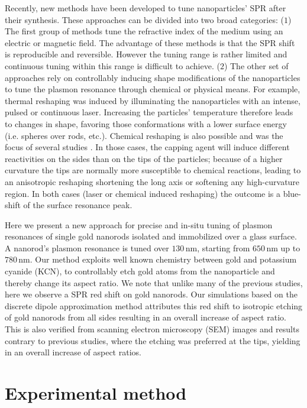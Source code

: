 \documentclass[a4paper,oneside,onecolumn]{article}
\newcommand{\nm}{\ensuremath{\,\textrm{nm}}}
\begin{document}
Recently, new methods have been developed to tune nanoparticles' SPR after their
synthesis. These approaches can be divided into two broad categories: ($1$) The
first group of methods tune the refractive index of the medium using an electric
or magnetic field\cite{Kossyrev2005}. The advantage of these methods is that the
SPR shift is reproducible and reversible. However the tuning range is rather
limited and continuous tuning within this range is difficult to achieve.
($2$) The other set of approaches rely on controllably inducing shape
modifications of the nanoparticles to tune the plasmon resonance through
chemical or physical means. For example, thermal reshaping was induced by
illuminating the nanoparticles with an intense, pulsed
\cite{Link2000}\cite{Horiguchi2008} or continuous laser\cite{Yorulmaz2012}.
Increasing the particles' temperature therefore leads to changes in shape,
favoring those conformations with a lower surface energy (i.e.
spheres over rods, etc.). Chemical reshaping is also possible and was the focus
of several studies\cite{Carbo-Argibay2007}
\cite{Rodriguez-Fernandez2005} \cite{Jana2002}. In those cases, the capping
agent will induce different reactivities on the sides than on the tips of the
particles; because of a higher curvature\cite{Yuan2015} the tips are
normally more susceptible to chemical reactions, leading to an anisotropic reshaping
shortening the long axis or softening any high-curvature region. In both cases
(laser or chemical induced reshaping) the outcome is a blue-shift of the surface
resonance peak.

Here we present a new approach for precise and in-situ tuning of plasmon
resonances of single gold nanorods isolated and immobilized over a glass
surface. A nanorod's plasmon resonance is tuned over $130\nm$, starting from
$650\nm$ up to $780\nm$. Our method exploits well known chemistry between gold
and potassium cyanide (KCN), to controllably etch gold atoms from the
nanoparticle and thereby change its aspect ratio. We note that unlike many of
the previous studies, here we observe a SPR red shift on gold nanorods.
Our simulations based on the discrete dipole approximation method attributes
this red shift to isotropic etching of gold nanorods from all sides resulting in
an overall increase of aspect ratio.  This is also verified from scanning
electron microscopy (SEM) images and results contrary to previous studies, where
the etching was preferred at the tips, yielding in an overall increase of
aspect ratios.

\section{Experimental method}
\end{document}
